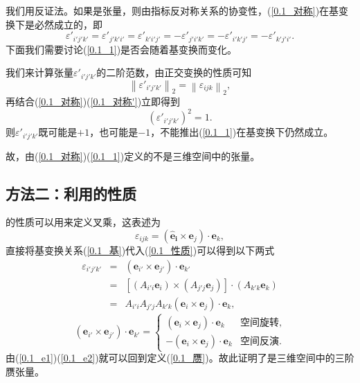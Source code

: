         我们用反证法。如果\nota{\ep}是张量，则由指标反对称关系的协变性，(\ref{0.1_对称})在基变换下是必然成立的，即
        \begin{equation}
                \varepsilon'_{i'j'k'} = \varepsilon'_{j'k'i'} = \varepsilon'_{k'i'j'} = -\varepsilon'_{j'i'k'} = -\varepsilon'_{i'k'j'} = -\varepsilon'_{k'j'i'} .
                \label{0.1_对称'}
        \end{equation}
        下面我们需要讨论(\ref{0.1_1})是否会随着基变换而变化。
        
        我们来计算张量$\varepsilon'_{i'j'k'}$的二阶范数，由正交变换的性质可知
        \begin{equation}
            \left \| \varepsilon'_{i'j'k'}  \right \| _2 = 
            \left \| \varepsilon_{ijk}  \right \| _2,
        \end{equation}
        再结合(\ref{0.1_对称})(\ref{0.1_对称'})立即得到
        \begin{equation}
            (\varepsilon'_{i'j'k'})^2 = 1.
        \end{equation}
        则$\varepsilon'_{i'j'k'}$既可能是$+1$，也可能是$-1$，不能推出(\ref{0.1_1})在基变换下仍然成立。
        
        故，由(\ref{0.1_对称})(\ref{0.1_1})定义的\nota{\ep}不是三维空间中的张量。
    
    \subsection{方法二：利用\nota{\ep}的性质}
    
    \nota{\ep}的性质可以用来定义叉乘，这表述为
    \begin{equation}
        \varepsilon_{ijk} = (\mathbf{
        \hat{e}_i} \times \bm{e}_j)\cdot \bm{e}_k,
        \label{0.1_性质}
    \end{equation}
    直接将基变换关系(\ref{0.1_基})代入(\ref{0.1_性质})可以得到以下两式
    \begin{eqnarray}
        \varepsilon_{i'j'k'} 
        & = & (\bm{e}_{i'} \times \bm{e}_{j'})\cdot \bm{e}_{k'}\\
        & = & \left[(A_{i'i}\bm{e}_i)\times(A_{j'j}\bm{e}_j) \right]\cdot (A_{k'k}\bm{e}_k)\\
        & = & A_{i'i}A_{j'j}A_{k'k}(\bm{e}_i \times \bm{e}_j)\cdot \bm{e}_k,\label{0.1_e1}
    \end{eqnarray}
    \begin{equation}
        (\bm{e}_{i'} \times \bm{e}_{j'})\cdot \bm{e}_{k'} = 
        \begin{cases}
            (\bm{e}_i \times \bm{e}_j)\cdot \bm{e}_k & \text{空间旋转},\\
            - (\bm{e}_i \times \bm{e}_j)\cdot \bm{e}_k & \text{空间反演}.\label{0.1_e2}
        \end{cases}
    \end{equation}
    由(\ref{0.1_e1})(\ref{0.1_e2})就可以回到定义(\ref{0.1_赝})。故此证明了\nota{\ep}是三维空间中的三阶赝张量。
    
